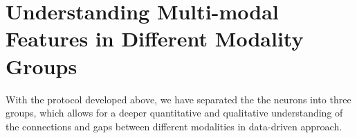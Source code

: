 

\vspace{-3mm}
\section{Understanding Multi-modal Features in Different Modality Groups}  
With the protocol developed above, we have separated the the neurons into three groups, which allows for a deeper quantitative and qualitative understanding of the connections and gaps between different modalities in data-driven approach.

\begin{table}[htbp]
\centering
{}
\caption{The visual and textual monosemanticity.}
\label{tab:relative_interpret}
\end{table}

